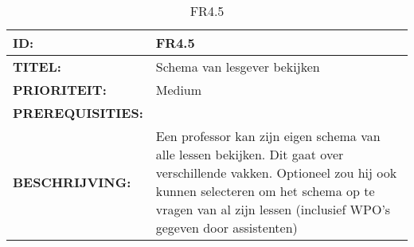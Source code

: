 \noindent\begin{table}[h]
            \begin{tabular}{l | p{10cm}}
                \textbf{ID:} & FR4.5 \\ \hline
                \textbf{TITEL:} & Schema van lesgever bekijken\\ \hline
                \textbf{PRIORITEIT:} &  Medium \\ \hline
                \textbf{PREREQUISITIES:} & \\ \hline
                \textbf{BESCHRIJVING:} & Een professor kan zijn eigen schema van alle lessen bekijken. Dit gaat over verschillende vakken. Optioneel zou hij ook kunnen selecteren om het schema op te vragen van al zijn lessen (inclusief WPO's gegeven door assistenten) \\ 
            \end{tabular}\\
            \caption{FR4.5}
            \label{tab:myfourteenthtable}
        \end{table}
        
